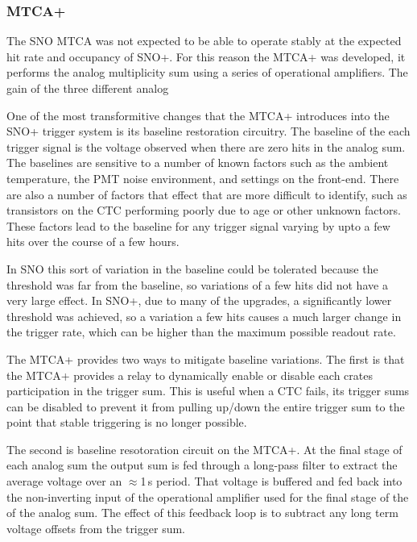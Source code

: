 \subsubsection{MTCA+}
\label{sec:mtcap}
The SNO MTCA was not expected to be able to operate stably at the expected
hit rate and occupancy of SNO+. For this reason the MTCA+ was developed,
it performs the analog multiplicity sum using a series of operational
amplifiers. The gain of the three different analog

One of the most transformitive changes that the MTCA+ introduces into
the SNO+ trigger system is its baseline restoration circuitry.
The baseline of the each trigger signal is the voltage observed
when there are zero hits in the analog sum.
The baselines are sensitive to a number of known factors such as the
ambient temperature, the PMT noise environment, and settings
on the front-end.
There are also a number of factors that effect that are more difficult
to identify, such as transistors on the CTC performing poorly due to
age or other unknown factors.
These factors lead to the baseline for any trigger signal varying
by upto a few hits over the course of a few hours.

In SNO this sort of variation in the baseline could be tolerated because
the threshold was far from the baseline, so variations of a few hits
did not have a very large effect.
In SNO+, due to many of the upgrades, a significantly lower threshold was achieved,
so a variation a few hits causes a much larger change in the trigger rate, which
can be higher than the maximum possible readout rate.

The MTCA+ provides two ways to mitigate baseline variations.
The first is that the MTCA+ provides a relay to dynamically enable or disable each
crates participation in the trigger sum.
This is useful when a CTC fails, its trigger sums can be disabled to prevent it from
pulling up/down the entire trigger sum to the point that stable triggering is no
longer possible.

The second is baseline resotoration circuit on the MTCA+. At the final
stage of each analog sum the output sum is fed through a long-pass
filter to extract the average voltage over an $\approx$1\,s period.
That voltage is buffered and fed back into the non-inverting input
of the operational amplifier used for the final stage of the
of the analog sum.
The effect of this feedback loop is to subtract any long term
voltage offsets from the trigger sum.

